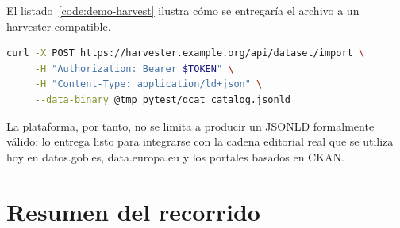 El listado~\ref{code:demo-harvest} ilustra cómo se entregaría el archivo a un harvester compatible.

\begin{lstlisting}[language=bash, caption={Envío del catálogo a un harvester CKAN con extensión DCAT.}, label=code:demo-harvest, captionpos=b]
curl -X POST https://harvester.example.org/api/dataset/import \
     -H "Authorization: Bearer $TOKEN" \
     -H "Content-Type: application/ld+json" \
     --data-binary @tmp_pytest/dcat_catalog.jsonld
\end{lstlisting}

La plataforma, por tanto, no se limita a producir un \ac{JSONLD} formalmente válido: lo entrega listo para integrarse con la cadena editorial real que se utiliza hoy en datos.gob.es, data.europa.eu y los portales basados en CKAN.

\section{Resumen del recorrido}\label{sec:demo-resumen}

